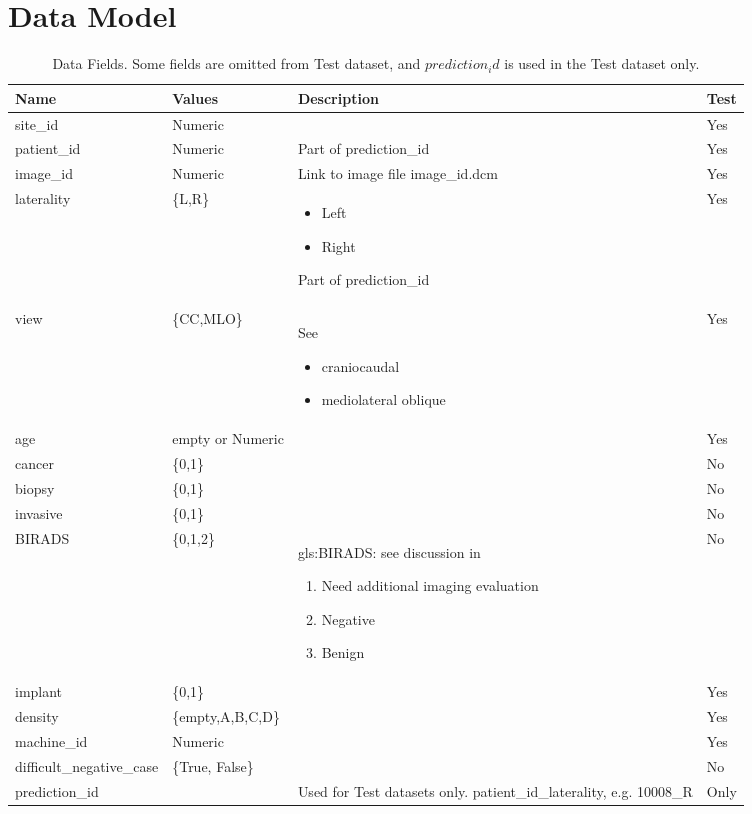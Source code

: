 \documentclass[]{article}
\begin{document}
\section{Data Model}
\begin{table}[H]
	\begin{center}
		\caption[Data Fields]{Data Fields. Some fields are omitted from Test dataset, and $prediction_id$ is used in the Test dataset only.}
		\begin{tabular}{|l|l|p{5cm}|l|}   \hline
			Name&Values&Description&Test\\  \hline
			site\_id&Numeric&&Yes\\  \hline
			patient\_id&Numeric&Part of	prediction\_id&Yes\\  \hline
			image\_id&Numeric&Link to image file image\_id.dcm&Yes\\  \hline
			laterality&\{L,R\}&\begin{itemize}
				\item Left
				\item Right
			\end{itemize}Part of	prediction\_id&Yes\\  \hline
			view&\{CC,MLO\}& See \cite{murphy2021mamography} \begin{itemize}
				\item craniocaudal 
				\item mediolateral oblique
			\end{itemize}&Yes\\  \hline
			age&empty or Numeric&&Yes\\  \hline
			cancer&\{0,1\}&&No\\  \hline
			biopsy&\{0,1\}&&No\\  \hline
			invasive&\{0,1\}&&No\\  \hline
			BIRADS&\{0,1,2\}&\gls{gls:BIRADS}: see discussion in \cite{pan2022what}\begin{enumerate}[start=0]
				\item Need additional imaging evaluation
				\item Negative
				\item Benign
			\end{enumerate}&No\\  \hline
			implant&\{0,1\}&&Yes\\  \hline
			density&\{empty,A,B,C,D\}&&Yes\\  \hline
			machine\_id&Numeric&&Yes\\  \hline
			difficult\_negative\_case&\{True, False\}&&No\\  \hline
			prediction\_id&&Used for Test datasets only. patient\_id\_laterality, e.g. 10008\_R&Only\\  \hline
		\end{tabular}
	\end{center}
\end{table}
\end{document}
